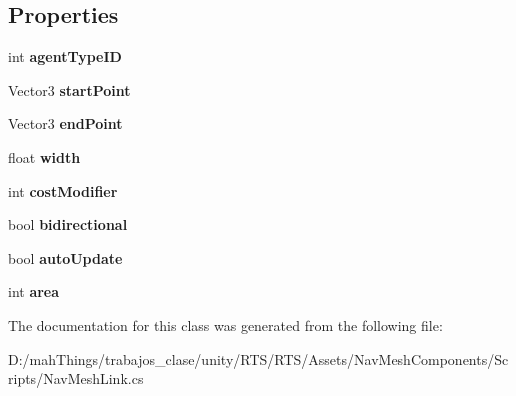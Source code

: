 \subsection*{Properties}
\begin{DoxyCompactItemize}
\item 
\mbox{\label{class_unity_engine_1_1_a_i_1_1_nav_mesh_link_a6799dbdf47aae6834c162077ee8e009d}} 
int {\bfseries agent\+Type\+ID}
\item 
\mbox{\label{class_unity_engine_1_1_a_i_1_1_nav_mesh_link_aa9f5067aa5cb0cc9d5a802252c82446f}} 
Vector3 {\bfseries start\+Point}
\item 
\mbox{\label{class_unity_engine_1_1_a_i_1_1_nav_mesh_link_a2949ad1009e22649b914278d80200cab}} 
Vector3 {\bfseries end\+Point}
\item 
\mbox{\label{class_unity_engine_1_1_a_i_1_1_nav_mesh_link_a7114269330fb7e61101bc6bd84d3ae26}} 
float {\bfseries width}
\item 
\mbox{\label{class_unity_engine_1_1_a_i_1_1_nav_mesh_link_a3ebc8915c5fba8de460b114d4f77b1b7}} 
int {\bfseries cost\+Modifier}
\item 
\mbox{\label{class_unity_engine_1_1_a_i_1_1_nav_mesh_link_a868f51870cc678fecb7b18c45eba00fc}} 
bool {\bfseries bidirectional}
\item 
\mbox{\label{class_unity_engine_1_1_a_i_1_1_nav_mesh_link_af696013572383671a2d5d172e00a6b5b}} 
bool {\bfseries auto\+Update}
\item 
\mbox{\label{class_unity_engine_1_1_a_i_1_1_nav_mesh_link_aa4d4bacb28beb552f2c7d4e7bb03a127}} 
int {\bfseries area}
\end{DoxyCompactItemize}


The documentation for this class was generated from the following file\+:\begin{DoxyCompactItemize}
\item 
D\+:/mah\+Things/trabajos\+\_\+clase/unity/\+R\+T\+S/\+R\+T\+S/\+Assets/\+Nav\+Mesh\+Components/\+Scripts/Nav\+Mesh\+Link.\+cs\end{DoxyCompactItemize}
